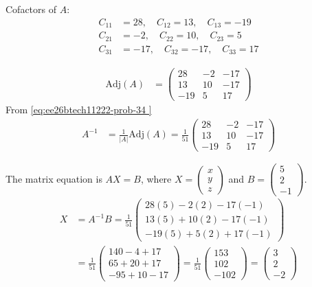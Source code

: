 \begin{enumerate}[label=\thesubsection.\arabic*, ref=\thesubsection.\theenumi]
Cofactors of $A$:
\begin{align*}
C_{11} &= 28, \quad C_{12} = 13, \quad C_{13} = -19 \\
C_{21} &= -2, \quad C_{22} = 10, \quad C_{23} = 5 \\
C_{31} &= -17, \quad C_{32} = -17, \quad C_{33} = 17
\end{align*}

\begin{align}
\text{Adj}(A) &= \begin{pmatrix} 28 & -2 & -17 \\ 13 & 10 & -17 \\ -19 & 5 & 17 \end{pmatrix} 
\end{align}
From \eqref{eq:ee26btech11222-prob-34 }
\begin{align}
A^{-1} &= \frac{1}{|A|} \text{Adj}(A) = \frac{1}{51} \begin{pmatrix} 28 & -2 & -17 \\ 13 & 10 & -17 \\ -19 & 5 & 17 \end{pmatrix}
\end{align}

The matrix equation is $AX = B$, where $X = \begin{pmatrix} x \\ y \\ z \end{pmatrix}$ and $B = \begin{pmatrix} 5 \\ 2 \\ -1 \end{pmatrix}$.
\begin{align*}
X &= A^{-1}B = \frac{1}{51} \begin{pmatrix} 28(5) - 2(2) - 17(-1) \\ 13(5) + 10(2) - 17(-1) \\ -19(5) + 5(2) + 17(-1) \end{pmatrix} \\
&= \frac{1}{51} \begin{pmatrix} 140 - 4 + 17 \\ 65 + 20 + 17 \\ -95 + 10 - 17 \end{pmatrix} = \frac{1}{51} \begin{pmatrix} 153 \\ 102 \\ -102 \end{pmatrix} = \begin{pmatrix} 3 \\ 2 \\ -2 \end{pmatrix}
\end{align*}


\end{enumerate}

